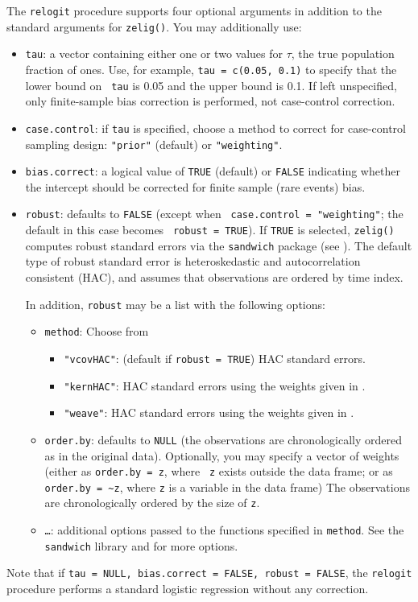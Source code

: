 The {\tt relogit} procedure supports four optional arguments in
addition to the standard arguments for {\tt zelig()}.  You may
additionally use:  
\begin{itemize}
\item {\tt tau}: a vector containing either one or two values for
  $\tau$, the true population fraction of ones.  Use, for example,
  {\tt tau = c(0.05, 0.1)} to specify that the lower bound on {\tt
  tau} is 0.05 and the upper bound is 0.1.  If left unspecified, only
finite-sample bias correction is performed, not case-control correction.
\item {\tt case.control}: if {\tt tau} is specified, choose a method
to correct for case-control sampling design: {\tt "prior"} (default)
or {\tt "weighting"}.   
\item {\tt bias.correct}: a logical value of {\tt TRUE} (default) or
  {\tt FALSE} indicating whether the intercept should be corrected for
  finite sample (rare events) bias.
\item {\tt robust}:  defaults to {\tt FALSE} (except when {\tt
case.control = "weighting"}; the default in this case becomes {\tt
robust = TRUE}). If {\tt TRUE} is selected, {\tt zelig()} computes
robust standard errors via the {\tt sandwich} package (see
\cite{Zeileis04}).  The default type of robust standard error is
heteroskedastic and autocorrelation consistent (HAC), and assumes that
observations are ordered by time index.

In addition, {\tt robust} may be a list with the following options:  
\begin{itemize}
\item {\tt method}:  Choose from 
\begin{itemize}
\item {\tt "vcovHAC"}: (default if {\tt robust = TRUE}) HAC standard
errors. 
\item {\tt "kernHAC"}: HAC standard errors using the
weights given in \cite{Andrews91}. 
\item {\tt "weave"}: HAC standard errors using the
weights given in \cite{LumHea99}.  
\end{itemize}  
\item {\tt order.by}: defaults to {\tt NULL} (the observations are
chronologically ordered as in the original data).  Optionally, you may
specify a vector of weights (either as {\tt order.by = z}, where {\tt
z} exists outside the data frame; or as {\tt order.by = \~{}z}, where
{\tt z} is a variable in the data frame)  The observations are
chronologically ordered by the size of {\tt z}.
\item {\tt \dots}:  additional options passed to the functions 
specified in {\tt method}.   See the {\tt sandwich} library and
\cite{Zeileis04} for more options.   
\end{itemize}
\end{itemize}
Note that if {\tt tau = NULL, bias.correct = FALSE, robust = FALSE},
the {\tt relogit} procedure performs a standard logistic regression
without any correction.

